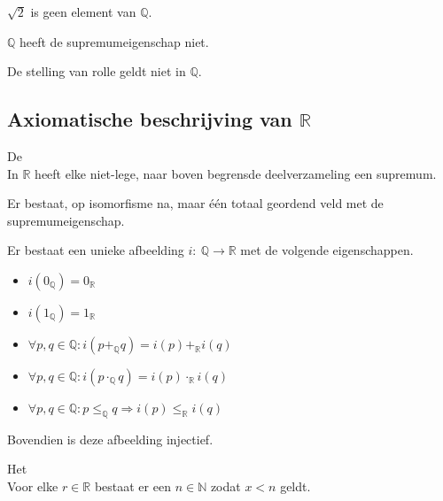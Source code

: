 \documentclass[main.tex]{subfiles}
\begin{document}
\begin{st}
  $\sqrt{2}$ is geen element van $\mathbb{Q}$.
\end{st}

\begin{st}
  $\mathbb{Q}$ heeft de supremumeigenschap niet.
\end{st}

\begin{st}
  De stelling van rolle geldt niet in $\mathbb{Q}$.
\end{st}


\subsection{Axiomatische beschrijving van $\mathbb{R}$}
\label{sec:axiom-beschr-van}

\begin{st}
  \label{st:supremumeigenschap-R}
  De \\
  In $\mathbb{R}$ heeft elke niet-lege, naar boven begrensde deelverzameling een supremum.
\end{st}

\begin{st}
  Er bestaat, op isomorfisme na, maar \'e\'en totaal geordend veld met de supremumeigenschap.
\end{st}

\begin{pr}
  Er bestaat een unieke afbeelding $i:\ \mathbb{Q} \rightarrow \mathbb{R}$ met de volgende eigenschappen.
  \begin{itemize}
  \item $i(0_{\mathbb{Q}}) = 0_{\mathbb{R}}$
  \item $i(1_{\mathbb{Q}}) = 1_{\mathbb{R}}$
  \item $\forall p,q \in \mathbb{Q}: i(p+_{\mathbb{Q}}q) = i(p) +_{\mathbb{R}} i(q)$
  \item $\forall p,q \in \mathbb{Q}: i(p\cdot_{\mathbb{Q}} q) = i(p) \cdot_{\mathbb{R}} i(q)$
  \item $\forall p,q \in \mathbb{Q}: p \le_{\mathbb{Q}} q \Rightarrow i(p) \le_{\mathbb{R}} i(q)$
  \end{itemize}
  Bovendien is deze afbeelding injectief.
\end{pr}

\begin{lem}
  Het \\
  Voor elke $r\in \mathbb{R}$ bestaat er een $n\in \mathbb{N}$ zodat $x < n$ geldt.
\end{lem}
\end{document}
